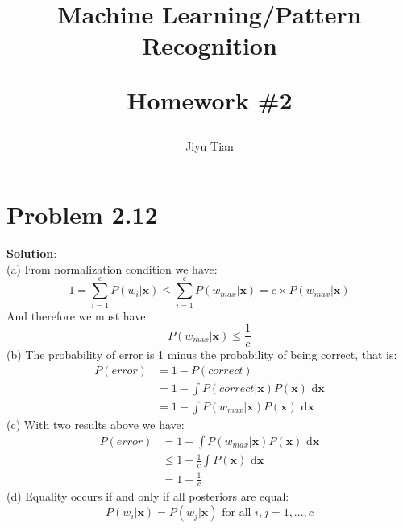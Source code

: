 \documentclass[12pt]{article}
\title{Machine Learning/Pattern Recognition\\  \begin{Large} Homework \#2 \end{Large} }
\author{Jiyu Tian}
\date{}
\begin{document}
\maketitle
\section{Problem 2.12}
\large{\textbf{Solution}}: \\
(a) From normalization condition we have:\\
\begin{equation*}
1 = \sum_{i=1}^{c} P(w_i|\bm{x}) \leq \sum_{i=1}^{c} P(w_{max}|\bm{x}) = c\times P(w_{max}|\bm{x})
\end{equation*}
And therefore we must have:
\begin{equation*}
P(w_{max}|\bm{x})\leq \frac{1}{c}
\end{equation*}
(b) The probability of error is 1 minus the probability of being correct, that is:
\begin{equation*}
\begin{aligned}
P(error) &= 1 - P(correct)\\ &= 1-\int P(correct|\bm{x})P(\bm{x}) \text{ d}\bm{x}\\ & = 1-\int P(w_{max}|\bm{x})P(\bm{x}) \text{ d}\bm{x}
\end{aligned}
\end{equation*}
(c) With two results above we have:
\begin{equation*}
\begin{aligned}
P(error)&=1-\int P(w_{max}|\bm{x})P(\bm{x})\text{ d}\bm{x}\\ &\leq 1- \frac{1}{c}\int P(\bm{x})\text{ d}\bm{x}\\ &= 1-\frac{1}{c}
\end{aligned}
\end{equation*}
(d) Equality occurs if and only if all posteriors are equal:
\begin{equation*}
P(w_i|\bm{x})=P(w_j|\bm{x}) \text{ for all }i,j=1,...,c
\end{equation*}


\vfill
\clearpage
\end{document}
